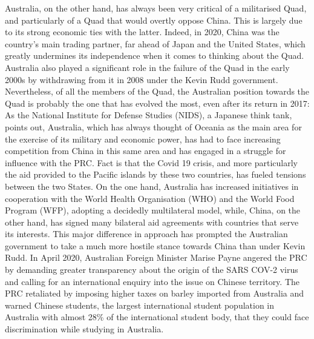 \documentclass[11pt,a4paper]{article}
\begin{document}
Australia, on the other hand, has always been very critical of a militarised Quad, and particularly of a Quad that would overtly oppose China. This is largely due to its strong economic ties with the latter. Indeed, in 2020, China was the country’s main trading partner, far ahead of Japan and the United States, which greatly undermines its independence when it comes to thinking about the Quad. Australia also played a significant role in the failure of the Quad in the early 2000s by withdrawing from it in 2008 under the Kevin Rudd government. Nevertheless, of all the members of the Quad, the Australian position towards the Quad is probably the one that has evolved the most, even after its return in 2017: As the National Institute for Defense Studies (NIDS), a Japanese think tank, points out, Australia, which has always thought of Oceania as the main area for the exercise of its military and economic power, has had to face increasing competition from China in this same area and has engaged in a struggle for influence with the PRC. Fact is that the Covid 19 crisis, and more particularly the aid provided to the Pacific islands by these two countries, has fueled tensions between the two States. On the one hand, Australia has increased initiatives in cooperation with the World Health Organisation (WHO) and the World Food Program (WFP), adopting a decidedly multilateral model, while, China, on the other hand, has signed many bilateral aid agreements with countries that serve its interests. This major difference in approach has prompted the Australian government to take a much more hostile stance towards China than under Kevin Rudd. In April 2020, Australian Foreign Minister Marise Payne angered the PRC by demanding greater transparency about the origin of the SARS COV-2 virus and calling for an international enquiry into the issue on Chinese territory. The PRC retaliated by imposing higher taxes on barley imported from Australia and warned Chinese students, the largest international student population in Australia with almost 28\% of the international student body, that they could face discrimination while studying in Australia.
\end{document}
